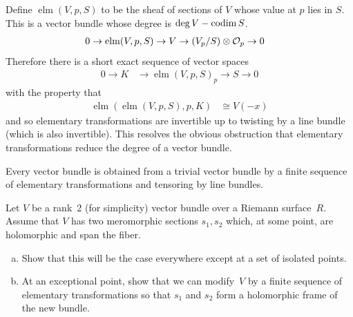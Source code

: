 \documentclass[12pt]{article}
\begin{document}
Define $\operatorname{elm}(V,p,S)$ to be the sheaf of sections of $V$ whose value at $p$ lies in $S$. This is a vector bundle whose degree is $\deg V - \operatorname{codim} S$.
\begin{align*}
    0 \to \operatorname{elm}(V,p,S) & \to V \to (V_p/S) \otimes {\mathcal{O}}_p \to 0
\end{align*} Therefore there is a short exact sequence of vector spaces \begin{align*}
    0 \to K & \to \operatorname{elm}(V,p,S)_p \to S \to 0
\end{align*} with the property that \begin{align*}
    \operatorname{elm}(\operatorname{elm}(V,p,S),p,K) & \cong V(-x)
\end{align*} and so elementary transformations are invertible up to twisting by a line bundle (which is also invertible). This resolves the obvious obstruction that elementary transformations reduce the degree of a vector bundle.



\begin{proposition}
    Every vector bundle is obtained from a trivial vector bundle by a finite sequence of elementary transformations and tensoring by line bundles.
\end{proposition}

\begin{exercise}
Let $V$ be a rank~2 (for simplicity) vector bundle over a Riemann surface~$R$. 
Assume that $V$ has two meromorphic sections $s_1, s_2$ which, at some point, 
are holomorphic and span the fiber.

\begin{enumerate}[(a)]
    \item Show that this will be the case everywhere except at a set of isolated points.
    \item At an exceptional point, show that we can modify~$V$ by a finite sequence 
    of elementary transformations so that $s_1$ and $s_2$ form a holomorphic frame 
    of the new bundle.
\end{enumerate}
\end{exercise}
\end{document}
